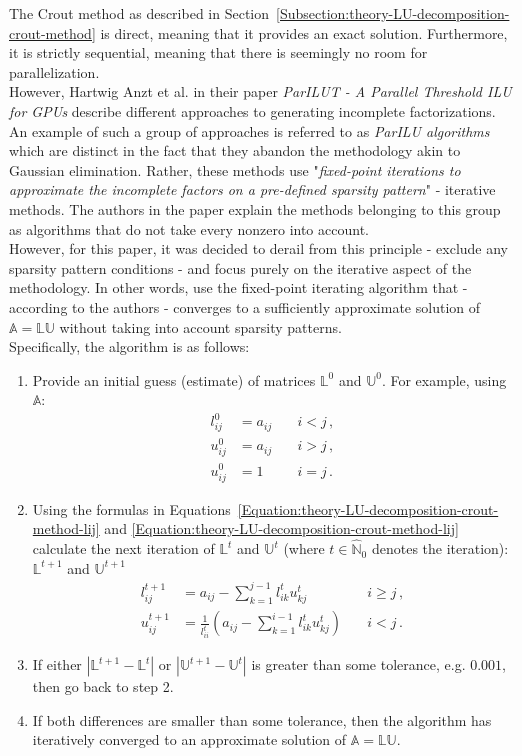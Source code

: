 The Crout method as described in Section~\ref{Subsection:theory-LU-decomposition-crout-method} is direct, meaning that it provides an exact solution. Furthermore, it is strictly sequential, meaning that there is seemingly no room for parallelization. \\
However, Hartwig Anzt et al. in their paper \emph{ParILUT - A Parallel Threshold ILU for GPUs} \cite{Anzt2019} describe different approaches to generating incomplete factorizations. An example of such a group of approaches is referred to as \textit{ParILU algorithms} which are distinct in the fact that they abandon the methodology akin to Gaussian elimination. Rather, these methods use "\textit{fixed-point iterations to approximate the incomplete factors on a pre-defined sparsity pattern}" - iterative methods. The authors in the paper explain the methods belonging to this group as algorithms that do not take every nonzero into account. \\
However, for this paper, it was decided to derail from this principle - exclude any sparsity pattern conditions - and focus purely on the iterative aspect of the methodology. In other words, use the fixed-point iterating algorithm that - according to the authors - converges to a sufficiently approximate solution of $ \mathbb{A} = \mathbb{LU} $ without taking into account sparsity patterns. \\
Specifically, the algorithm is as follows:

\begin{enumerate}
	\item Provide an initial guess (estimate) of matrices $ \mathbb{L}^0 $ and $ \mathbb{U}^0 $. For example, using $ \mathbb{A} $:
		\begin{align}
			l_{ij}^{0} &= a_{ij} \quad &i < j \nonumber\,, \\
			u_{ij}^{0} &= a_{ij} \quad &i > j \nonumber\,, \\
			u_{ij}^{0} &= 1 \quad      &i = j \nonumber\,.
		\end{align}
	\item Using the formulas in Equations~\ref{Equation:theory-LU-decomposition-crout-method-lij} and \ref{Equation:theory-LU-decomposition-crout-method-lij} calculate the next iteration of $ \mathbb{L}^{t} $ and $ \mathbb{U}^{t} $ (where $ t \in \widehat{\mathbb{N}}_0 $ denotes the iteration): $ \mathbb{L}^{t+1} $ and $ \mathbb{U}^{t+1} $
		\begin{align}
			l_{ij}^{t+1} &= a_{ij} - \sum_{k=1}^{j-1}l_{ik}^{t}u_{kj}^{t} 								   		&\quad i \geq j \nonumber\,, \\
			u_{ij}^{t+1} &= \frac{1}{l_{ii}^{t}} \left ( a_{ij} - \sum_{k=1}^{i-1}l_{ik}^{t}u_{kj}^{t} \right ) &\quad i < j    \nonumber\,. 
		\end{align}
	\item If either $ \left | \mathbb{L}^{t+1} - \mathbb{L}^{t} \right | $ or $ \left | \mathbb{U}^{t+1} - \mathbb{U}^{t} \right | $ is greater than some tolerance, e.g. $ 0.001 $, then go back to step 2.
	\item If both differences are smaller than some tolerance, then the algorithm has iteratively converged to an approximate solution of $ \mathbb{A} = \mathbb{LU} $.
\end{enumerate}

